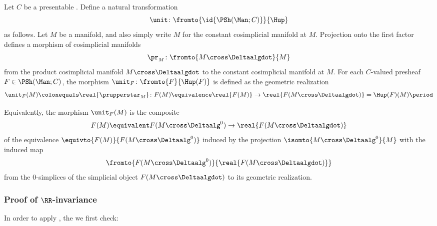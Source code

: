 \begin{construction}
	Let $ C $ be a presentable \category.
	Define a natural transformation
	\begin{equation*}
		\unit \colon \fromto{\id{\PSh(\Man;C)}}{\Hup} 
	\end{equation*}
	as follows.
	Let $ M $ be a manifold, and also simply write $ M $ for the constant cosimplicial manifold at $ M $.
	Projection onto the first factor defines a morphism of cosimplicial manifolds
	\begin{equation*}
		\pr_M \colon \fromto{M \cross \Deltaalgdot}{M}
	\end{equation*}
	from the product cosimplicial manifold $ M \cross \Deltaalgdot $ to the constant cosimplicial manifold at $ M $.
	For each $ C $-valued presheaf $ F \in \PSh(\Man;C) $, the morphism $ \unit_F \colon \fromto{F}{\Hup(F)} $ is defined as the geometric realization
	\begin{equation*}
		\unit_F(M) \colonequals \real{\prupperstar_M} \colon F(M) \equivalence \real{F(M)} \to \real{F(M \cross \Deltaalgdot)} = \Hup(F)(M) \period
	\end{equation*}

	Equivalently, the morphism $ \unit_F(M) $ is the composite
	\begin{equation*}
		F(M) \equivalent F(M \cross \Deltaalg^0) \to \real{F(M \cross \Deltaalgdot)}
	\end{equation*}
	of the equivalence $ \equivto{F(M)}{F(M \cross \Deltaalg^0)} $ induced by the projection $ \isomto{M \cross \Deltaalg^0}{M} $ with the induced map
	\begin{equation*}
		\fromto{F(M \cross \Deltaalg^0)}{\real{F(M \cross \Deltaalgdot)}}
	\end{equation*}
	from the $ 0 $-simplices of the simplicial object $ F(M \cross \Deltaalgdot) $ to its geometric realization. 
\end{construction}


\subsubsection{Proof of \texorpdfstring{$ \RR $}{ℝ}-invariance}

In order to apply , the we first check:

